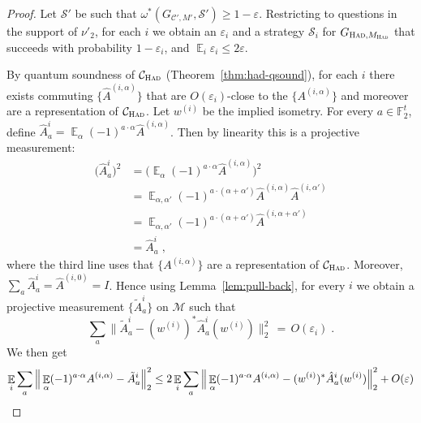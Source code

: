 \documentclass[11pt]{article}
\theoremstyle{definition}
\newcommand{\code}{\mathcal{C}}
\newcommand{\strategy}{\mathscr{S}}
\newcommand{\Id}{\ensuremath{I}}
\DeclareMathOperator*{\Expectation}{\mathbb{E}}
\newcommand{\Es}[1]{\Expectation_{#1}}
\newcommand{\F}{\ensuremath{\mathbb{F}}}
\newcommand{\cM}{\ensuremath{\mathcal{M}}}
\newcommand{\Had}{\ensuremath{\textsc{Had}}}
\newcommand{\had}{\textsc{Had}}
\newcommand{\eps}{\varepsilon}
\begin{document}
\begin{proof}
Let $\strategy'$ be such that $\omega^*(G_{\code',M'},\strategy')\geq 1-\eps$. Restricting to questions in the support of $\nu'_2$, for each $i$ we obtain an $\eps_i$ and a strategy $\strategy_i$ for $G_{\had,M_\had}$ that succeeds with probability $1-\eps_i$, and $\Es{i} \eps_i \leq 2\eps$. 

By quantum soundness of $\code_\Had$ (Theorem~\ref{thm:had-qsound}), for each $i$ there exists commuting $\{\hat{A}^{(i,\alpha)}\}$ that are $O(\eps_i)$-close to the $\{A^{(i,\alpha)}\}$ and moreover are a representation of $\code_{\Had}$. Let $w^{(i)}$ be the implied isometry. For every $a\in \F_2^t$, define $\hat{A}^{i}_{a}=\Es{\alpha}(-1)^{a\cdot \alpha} \hat{A}^{(i,\alpha)}$. Then by linearity this is a projective measurement:
\begin{align*}
\big(\hat{A}^{i}_{a}\big)^2 &=\Big(\Es{\alpha}(-1)^{a\cdot \alpha} \hat{A}^{(i,\alpha)}\Big)^2\\
&= \Es{\alpha,\alpha' }(-1)^{a\cdot (\alpha+\alpha')} \hat{A}^{(i,\alpha)}\hat{A}^{(i,\alpha')}\\
&=\Es{\alpha,\alpha' }(-1)^{a\cdot (\alpha+\alpha')} \hat{A}^{(i,\alpha+\alpha')}\\
&=\hat{A}^{i}_{a}\;,
\end{align*}
where the third line uses that  $\{A^{(i,\alpha)}\}$ are a representation of $\code_{\Had}$. Moreover, $\sum_a \hat{A}^{i}_{a} = \hat{A}^{(i,0)}=\Id$. Hence using Lemma~\ref{lem:pull-back}, for every $i$ we obtain a projective measurement $\{\tilde{A}^{i}_{a}\}$ on $\cM$ such that
\begin{equation}\label{eq:qto2-1a}
 \sum_a \big\| \tilde{A}^i_a - (w^{(i)})^* \hat{A}^i_a (w^{(i)}) \big\|_2^2 \,=\, O(\eps_i)\;.
\end{equation}
We then get
\begin{align}
 \Es{i} \sum_a \Big\| \Es{\alpha} (-1)^{a\cdot \alpha} A^{(i,\alpha)} -  \tilde{A}^i_a \Big\|_2^2 
&\leq  2\Es{i} \sum_a \Big\| \Es{\alpha} (-1)^{a\cdot \alpha} A^{(i,\alpha)} -  (w^{(i)})^* \hat{A}^i_a (w^{(i)}) \Big\|_2^2 + O(\eps)\notag\\

\end{align}
\end{proof}
\end{document}
